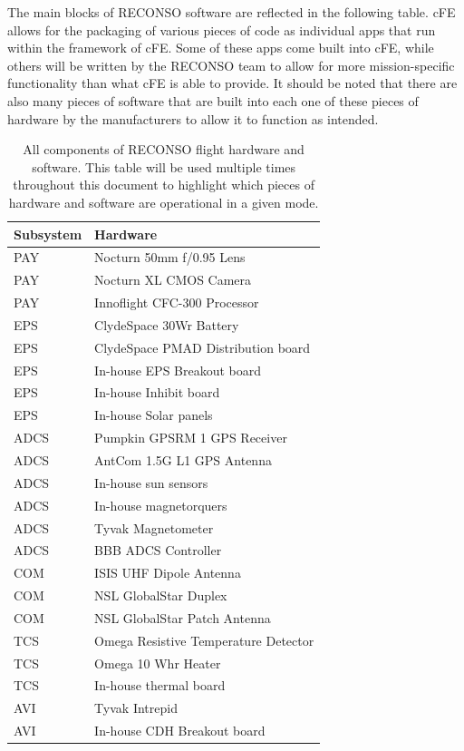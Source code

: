 \documentclass{article}
\begin{document}
The main blocks of RECONSO software are reflected in the following table. cFE allows for the packaging of various pieces of code as individual apps that run within the framework of cFE. Some of these apps come built into cFE, while others will be written by the RECONSO team to allow for more mission-specific functionality than what cFE is able to provide. It should be noted that there are also many pieces of software that are built into each one of these pieces of hardware by the manufacturers to allow it to function as intended.

\begin{table}[h!]
\caption{All components of RECONSO flight hardware and software. This table will be used multiple times throughout this document to highlight which pieces of hardware and software are operational in a given mode.}
\begin{adjustbox}{center}
\begin{tabular}{|l|l|}
\hline
Subsystem & Hardware \\ \hline \hline
PAY & Nocturn 50mm f/0.95 Lens  \\ \hline
PAY & Nocturn XL CMOS Camera  \\ \hline
PAY & Innoflight CFC-300 Processor  \\ \hline \hline
EPS & ClydeSpace 30Wr Battery \\ \hline
EPS & ClydeSpace PMAD Distribution board  \\ \hline
EPS & In-house EPS Breakout board \\ \hline
EPS & In-house Inhibit board  \\ \hline
EPS & In-house Solar panels  \\ \hline \hline
ADCS & Pumpkin GPSRM 1 GPS Receiver \\ \hline
ADCS & AntCom 1.5G L1 GPS Antenna  \\ \hline
ADCS & In-house sun sensors  \\ \hline
ADCS & In-house magnetorquers  \\ \hline
ADCS & Tyvak Magnetometer \\ \hline
ADCS & BBB ADCS Controller \\ \hline \hline
COM & ISIS UHF Dipole Antenna  \\ \hline
COM & NSL GlobalStar Duplex  \\ \hline
COM & NSL GlobalStar Patch Antenna \\ \hline \hline
TCS & Omega Resistive Temperature Detector \\ \hline
TCS & Omega 10 Whr Heater  \\ \hline
TCS & In-house thermal board \\ \hline \hline
AVI & Tyvak Intrepid \\ \hline
AVI & In-house CDH Breakout board \\ \hline 
\end{tabular}


\end{adjustbox}
\end{table}
\end{document}
